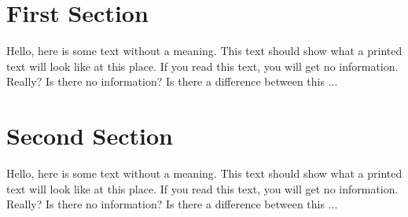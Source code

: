 \documentclass[a4paper,12pt]{article}
\begin{document}
 
\section{First Section}
 
Hello,  here  is  some  text  without  a  meaning.   This  
text  should  show  what  a printed text will look like at 
this place.  If you read this text, you will get no information.  
Really?  Is there no information?  Is there a difference between 
this ...
 
\newpage

\section{Second Section}
 
Hello,  here  is  some  text  without  a  meaning.   This  
text  should  show  what  a printed text will look like at 
this place.  If you read this text, you will get no information.  
Really?  Is there no information?  Is there a difference between 
this ...
\end{document}
